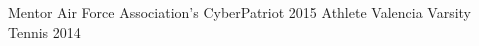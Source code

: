 \begin{cvhonors}

\cvhonor
    {Mentor} %
    {Air Force Association's CyberPatriot} %
    {} %
    {2015} %
  \cvhonor
    {Athlete} %
    {Valencia Varsity Tennis} %
    {} %
    {2014} %
\end{cvhonors}